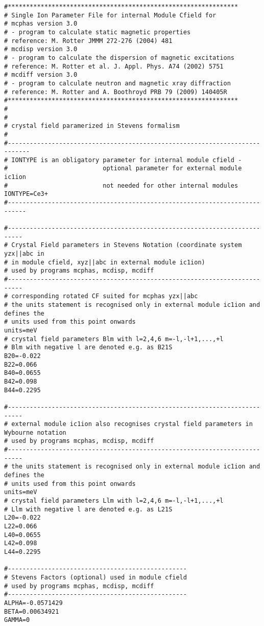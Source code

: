 \begin{verbatim}
#***************************************************************
# Single Ion Parameter File for internal Module Cfield for  
# mcphas version 3.0
# - program to calculate static magnetic properties
# reference: M. Rotter JMMM 272-276 (2004) 481
# mcdisp version 3.0
# - program to calculate the dispersion of magnetic excitations
# reference: M. Rotter et al. J. Appl. Phys. A74 (2002) 5751
# mcdiff version 3.0
# - program to calculate neutron and magnetic xray diffraction
# reference: M. Rotter and A. Boothroyd PRB 79 (2009) 140405R
#***************************************************************
#
#
# crystal field paramerized in Stevens formalism
#
#----------------------------------------------------------------------------
# IONTYPE is an obligatory parameter for internal module cfield -
#                          optional parameter for external module ic1ion
#                          not needed for other internal modules 
IONTYPE=Ce3+
#---------------------------------------------------------------------------

#--------------------------------------------------------------------------
# Crystal Field parameters in Stevens Notation (coordinate system yzx||abc in 
# in module cfield, xyz||abc in external module ic1ion)
# used by programs mcphas, mcdisp, mcdiff
#--------------------------------------------------------------------------
# corresponding rotated CF suited for mcphas yzx||abc
# the units statement is recognised only in external module ic1ion and defines the 
# units used from this point onwards
units=meV
# crystal field parameters Blm with l=2,4,6 m=-l,-l+1,...,+l
# Blm with negative l are denoted e.g. as B21S
B20=-0.022
B22=0.066
B40=0.0655
B42=0.098
B44=0.2295

#--------------------------------------------------------------------------
# external module ic1ion also recognises crystal field parameters in Wybourne notation
# used by programs mcphas, mcdisp, mcdiff
#--------------------------------------------------------------------------
# the units statement is recognised only in external module ic1ion and defines the 
# units used from this point onwards
units=meV
# crystal field parameters Llm with l=2,4,6 m=-l,-l+1,...,+l
# Llm with negative l are denoted e.g. as L21S
L20=-0.022
L22=0.066
L40=0.0655
L42=0.098
L44=0.2295

#-------------------------------------------------
# Stevens Factors (optional) used in module cfield
# used by programs mcphas, mcdisp, mcdiff
#-------------------------------------------------
ALPHA=-0.0571429
BETA=0.00634921
GAMMA=0


\end{verbatim}

